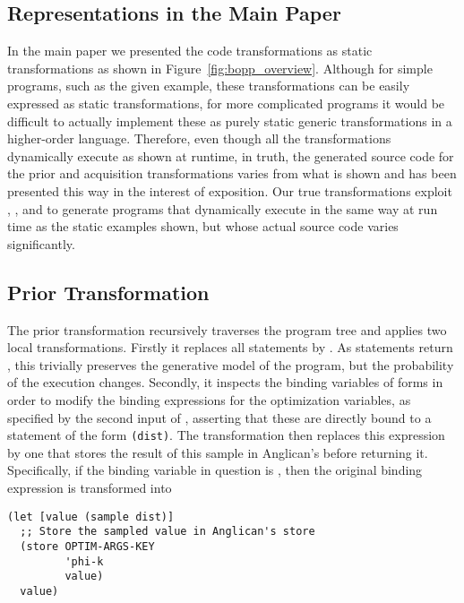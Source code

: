 \subsection{Representations in the Main Paper}
\label{sec:bopp-supp/main-paper-rep}

In the main paper we presented the code transformations as static transformations as shown in Figure~\ref{fig:bopp_overview}.  Although for simple programs, such as the given example, these transformations can be easily expressed as static transformations, for more complicated programs it would be difficult to actually implement these as purely static generic transformations in a higher-order language.  Therefore, even though all the transformations dynamically execute as shown at runtime, in truth, the generated source code for the prior and acquisition transformations varies from what is shown and has been presented this way in the interest of exposition.  Our true transformations exploit , ,  and  to generate programs that dynamically execute in the same way at run time as the static examples shown, but whose actual source code varies significantly.

\subsection{Prior Transformation}
\label{sec:bopp-supp/prior-transformations}
The prior transformation recursively traverses the program tree and applies two local transformations.  
Firstly it replaces all \observe statements by .  
As \observe statements return , this trivially preserves the generative model of the program, but the probability of the execution changes. 
Secondly, it inspects the binding variables of  forms in order to modify the binding expressions for the optimization variables, as specified by the second input of , asserting that these are directly bound to a \sample statement of the form \texttt{(\sample dist)}.
The transformation then replaces this expression by one that stores the result of this sample in Anglican's  before returning it.
Specifically, if the binding variable in question is , then the original binding expression  is transformed into
    \begin{lstlisting}[basicstyle=\footnotesize\ttfamily]
(let [value (sample dist)]
  ;; Store the sampled value in Anglican's store
  (store OPTIM-ARGS-KEY
         'phi-k
         value)
  value)
    \end{lstlisting}

